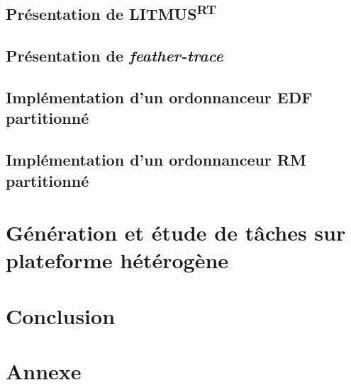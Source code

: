 \documentclass{article}
\newcommand{\litmus}{LITMUS\textsuperscript{RT}}
\begin{document}
    \subsection{Présentation de \litmus}
    
    
    
    \subsection{Présentation de \textit{feather-trace}}
    


    \subsection{Implémentation d'un ordonnanceur EDF partitionné}
    
    
    
    \subsection{Implémentation d'un ordonnanceur RM partitionné}

    
    
    
    \newpage
    \section[Génération de tâches]{Génération et étude de tâches sur plateforme hétérogène}

    


    \newpage
    \section*{Conclusion}



    


    \newpage
    \section*{Annexe}
    

    \newpage
    \listoffigures
    \lstlistoflistings


    \newpage

    \printnoidxglossaries %
    
\end{document}
